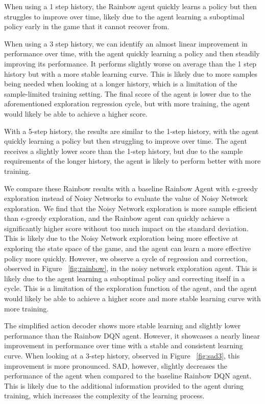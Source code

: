 When using a 1 step history, the Rainbow agent quickly learns a policy but then struggles to improve over time, likely due to the agent learning a suboptimal policy early in the game that it cannot recover from.

When using a 3 step history, we can identify an almost linear improvement in performance over time, with the agent quickly learning a policy and then steadily improving its performance. It performs slightly worse on average than the 1 step history but with a more stable learning curve. This is likely due to more samples being needed when looking at a longer history, which is a limitation of the sample-limited training setting. The final score of the agent is lower due to the aforementioned exploration regression cycle, but with more training, the agent would likely be able to achieve a higher score.

With a 5-step history, the results are similar to the 1-step history, with the agent quickly learning a policy but then struggling to improve over time. The agent receives a slightly lower score than the 1-step history, but due to the sample requirements of the longer history, the agent is likely to perform better with more training.

We compare these Rainbow results with a baseline Rainbow Agent with $\epsilon$-greedy exploration instead of Noisy Networks to evaluate the value of Noisy Network exploration. We find that the Noisy Network exploration is more sample efficient than $\epsilon$-greedy exploration, and the Rainbow agent can quickly achieve a significantly higher score without too much impact on the standard deviation. This is likely due to the Noisy Network exploration being more effective at exploring the state space of the game, and the agent can learn a more effective policy more quickly. However, we observe a cycle of regression and correction, observed in Figure ~\ref{fig:rainbow}, in the noisy network exploration agent. This is likely due to the agent learning a suboptimal policy and correcting itself in a cycle. This is a limitation of the exploration function of the agent, and the agent would likely be able to achieve a higher score and more stable learning curve with more training.

The simplified action decoder shows more stable learning and slightly lower performance than the Rainbow DQN agent. However, it showcases a nearly linear improvement in performance over time with a stable and consistent learning curve. When looking at a 3-step history, observed in Figure ~\ref{fig:sad3}, this improvement is more pronounced. SAD, however, slightly decreases the performance of the agent when compared to the baseline Rainbow DQN agent. This is likely due to the additional information provided to the agent during training, which increases the complexity of the learning process.

